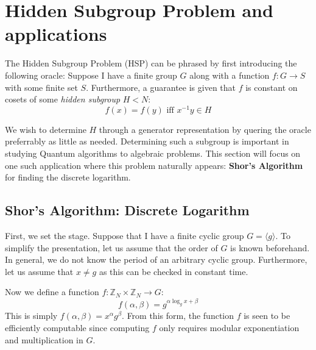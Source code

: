 \documentclass{../quantum.tex}
\begin{document}
\section{Hidden Subgroup Problem and applications}

The Hidden Subgroup Problem (HSP) can be phrased by first introducing the following oracle:
%
Suppose I have a finite group $G$ along with a function $f: G \rightarrow S$ with some finite set $S$. Furthermore, a guarantee is given that $f$ is constant on cosets of some
\textit{hidden subgroup} $H < N$:
%
$$ f(x) = f(y) \text{ iff } x^{-1}y \in H $$

We wish to determine $H$ through a generator representation by quering the oracle preferrably as little as needed. Determining such a subgroup is important in studying Quantum algorithms to algebraic problems. This section will focus on one such application where this problem naturally appears: {\bf Shor's Algorithm} for finding the discrete logarithm.
%

\subsection{Shor's Algorithm: Discrete Logarithm}
First, we set the stage. Suppose that I have a finite cyclic group $G = \langle g \rangle$. To simplify the presentation, let us assume that the order of $G$ is known beforehand. In general, we do not know the period of an arbitrary cyclic group. Furthermore, let us assume that $x \neq g$ as this can be checked in constant time.
%

Now we define a function $f: \mathbb{Z}_N \times \mathbb{Z}_N \rightarrow G$:
\begin{equation}
  f(\alpha,\beta) = g^{\alpha\log_g{x} + \beta}
\end{equation}
This is simply $f(\alpha,\beta) = x^{\alpha}g^{\beta}$. From this form, the function $f$ is seen to be efficiently computable since computing $f$ only requires modular exponentiation and multiplication in $G$.
\end{document}
